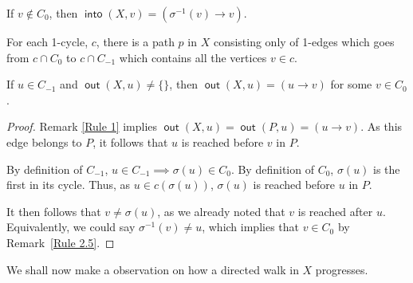 \documentclass{article}
\DeclareMathOperator{\out}{\bm{\mathsf{out}}}
\DeclareMathOperator{\into}{\bm{\mathsf{into}}}
\newcommand{\dc}[1]{}%
\begin{document}
\begin{rmk} \label{Rule 2.5} If $v \not \in C_0$, then $\into(X,v) = (\sigma^{-1}(v)\to v)$.
\end{rmk}

\begin{rmk}\label{Rule 2.75} For each 1-cycle, $c$, there is a path $p$ in $X$ consisting only of 1-edges which goes from $c\cap C_0$ to $c \cap C_{-1}$ which contains all the vertices $v \in c$.
\end{rmk}

\vspace{1.75em}

\begin{rmk} \label{Rule 3} If $u \in C_{-1}$ and $\out(X,u) \neq \{\}$\dc{ tail}, then $\out(X,u) = (u \to v)$ for some $v \in C_0$. 
\begin{proof}Remark \ref{Rule 1} implies $\out(X,u)= \out(P,u) = (u\to v)$. As this edge belongs to $P$, it follows that $u$ is reached before $v$ in $P$. 

\vspace{.75em}

By definition of $C_{-1}$, $u \in C_{-1} \implies \sigma(u) \in C_0$. By definition of $C_0$, $\sigma(u)$ is the first in its cycle. Thus, as $u \in c(\sigma(u))$, $\sigma(u)$ is reached before $u$ in $P$.

\vspace{.75em}

It then follows that $v\neq \sigma(u)$, as we already noted that $v$ is reached after $u$. Equivalently, we could say $\sigma^{-1}(v) \neq u$, which implies that $v \in C_0$ by Remark~\ref{Rule 2.5}.\end{proof}

\end{rmk}



\vspace{1.75em}

We shall now make a observation on how a directed walk in $X$ progresses. 
\end{document}
